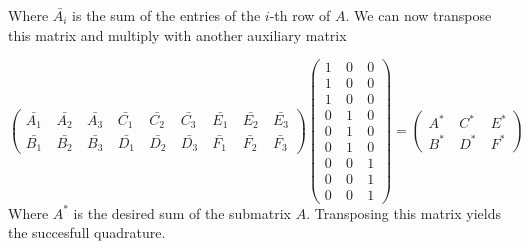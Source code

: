 \documentclass[a4paper,12pt]{article}
\begin{document}
Where $\bar{A_i}$ is the sum of the entries of the $i$-th row of $A$. We can now transpose this matrix and multiply with another auxiliary matrix

\[\begin{pmatrix} \bar{A_1} &\ \bar{A_2} &\ \bar{A_3} &\ \bar{C_1} &\ \bar{C_2} &\ \bar{C_3} &\ \bar{E_1} &\ \bar{E_2} &\ \bar{E_3} \\
\bar{B_1} &\ \bar{B_2} &\ \bar{B_3} &\ \bar{D_1} &\ \bar{D_2} &\ \bar{D_3} &\ \bar{F_1} &\ \bar{F_2} &\ \bar{F_3} \end{pmatrix}
\begin{pmatrix} 1 &\ 0 &\ 0 \\
				1 &\ 0 &\ 0 \\
                1 &\ 0 &\ 0 \\
                0 &\ 1 &\ 0 \\
                0 &\ 1 &\ 0 \\
                0 &\ 1 &\ 0 \\
                0 &\ 0 &\ 1 \\
                0 &\ 0 &\ 1 \\
                0 &\ 0 &\ 1 \end{pmatrix} = \begin{pmatrix} A^* &\ C^* &\ E^* \\ B^* &\ D^* &\ F^* \end{pmatrix} \]
Where $A^*$ is the desired sum of the submatrix $A$. Transposing this matrix yields the succesfull quadrature.
\end{document}
